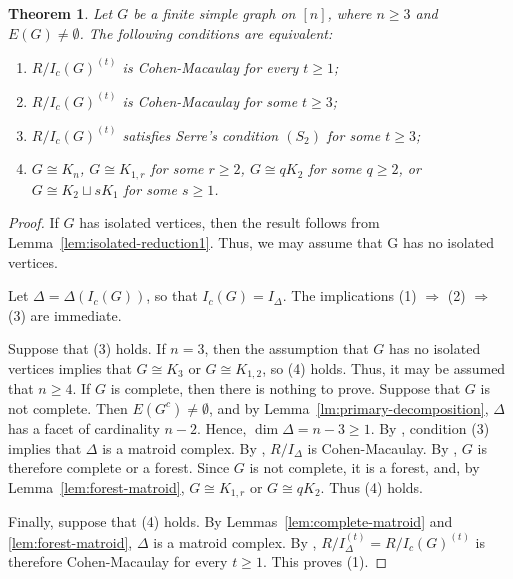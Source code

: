 \documentclass[12pt]{amsart}
\newtheorem{theorem}[proposition]{Theorem}
\begin{document}
\begin{theorem}\label{thm:symbolic-CM}
Let $G$ be a finite simple graph on $[n]$, where $n\geq 3$ and $E(G)\neq\emptyset$. The following conditions are equivalent:
\begin{enumerate}
\item $R/I_c(G)^{(t)}$ is Cohen-Macaulay for every $t\geq 1$;
\item $R/I_c(G)^{(t)}$ is Cohen-Macaulay for some $t\geq 3$;
\item $R/I_c(G)^{(t)}$ satisfies Serre's condition $(S_2)$ for some $t\geq 3$;
\item $G\cong K_n$, $G\cong K_{1,r}$ for some $r\geq 2$, $G\cong qK_2$ for some $q\geq 2$, or $G\cong K_2\sqcup sK_1$ for some $s\geq 1$.
\end{enumerate}
\end{theorem}

\begin{proof}
If $G$ has isolated vertices, then the result follows from Lemma~\ref{lem:isolated-reduction1}. Thus, we may assume that G has no isolated vertices.

Let \(\Delta=\Delta(I_c(G))\), so that \(I_c(G)=I_\Delta\). The implications (1) \(\Rightarrow\) (2) \(\Rightarrow\) (3) are immediate.

Suppose that (3) holds. If \(n=3\), then the assumption that \(G\) has no isolated vertices implies that \(G\cong K_3\) or \(G\cong K_{1,2}\), so (4) holds. Thus, it may be assumed that \(n\ge4\). If \(G\) is complete, then there is nothing to prove. Suppose that \(G\) is not complete. Then \(E(G^c)\ne\emptyset\), and by Lemma~\ref{lm:primary-decomposition}, \(\Delta\) has a facet of cardinality \(n-2\). Hence, \(\dim\Delta=n-3\ge1.\) By \cite[Theorem~3.6]{Trung-Terai}, condition (3) implies that \(\Delta\) is a matroid complex. By \cite[Theorem~3.5]{MT11}, \(R/I_\Delta\) is Cohen-Macaulay. By \cite[Theorem~2.8]{fm25}, \(G\) is therefore complete or a forest. Since \(G\) is not complete, it is a forest, and, by Lemma~\ref{lem:forest-matroid}, \(G\cong K_{1,r}\) or \(G\cong qK_2\). Thus (4) holds.

Finally, suppose that (4) holds. By Lemmas~\ref{lem:complete-matroid} and \ref{lem:forest-matroid}, \(\Delta\) is a matroid complex. By \cite[Theorem~3.5]{MT11}, \(R/I_\Delta^{(t)}=R/I_c(G)^{(t)}\) is therefore Cohen-Macaulay for every \(t\ge1\). This proves (1).
\end{proof}
\end{document}
